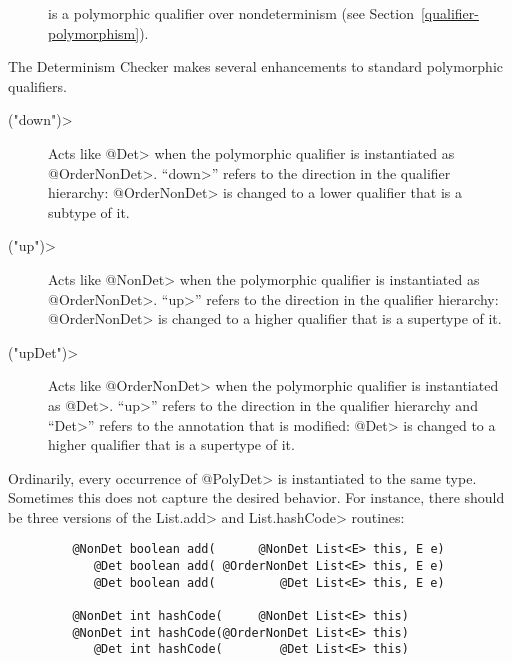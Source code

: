
\begin{description}
\item[] is a
  polymorphic qualifier over nondeterminism (see Section~\ref{qualifier-polymorphism}).
\end{description}

The Determinism Checker makes
several enhancements to standard polymorphic qualifiers.



\begin{description}
\item[\<("down")>]
  Acts like \<@Det> when the polymorphic qualifier is instantiated as
  \<@OrderNonDet>.
  ``\<down>'' refers to the direction in the qualifier hierarchy:
  \<@OrderNonDet> is changed to a lower qualifier that is a subtype of it.
\item[\<("up")>]
  Acts like \<@NonDet> when the polymorphic qualifier is instantiated as
  \<@OrderNonDet>.
  ``\<up>'' refers to the direction in the qualifier hierarchy:
  \<@OrderNonDet> is changed to a higher qualifier that is a supertype of it.
\item[\<("upDet")>]
  Acts like \<@OrderNonDet> when the polymorphic qualifier is instantiated as
  \<@Det>.
  ``\<up>'' refers to the direction in the qualifier hierarchy and ``\<Det>''
  refers to the annotation that is modified:
  \<@Det> is changed to a higher qualifier that is a supertype of it.
\end{description}

Ordinarily, every occurrence of \<@PolyDet> is instantiated to the same
type.  Sometimes this does not capture the desired behavior.  For instance,
there should be three versions of the \<List.add> and \<List.hashCode> routines:

\begin{Verbatim}
         @NonDet boolean add(      @NonDet List<E> this, E e)
            @Det boolean add( @OrderNonDet List<E> this, E e)
            @Det boolean add(         @Det List<E> this, E e)

         @NonDet int hashCode(     @NonDet List<E> this)
         @NonDet int hashCode(@OrderNonDet List<E> this)
            @Det int hashCode(        @Det List<E> this)
\end{Verbatim}

